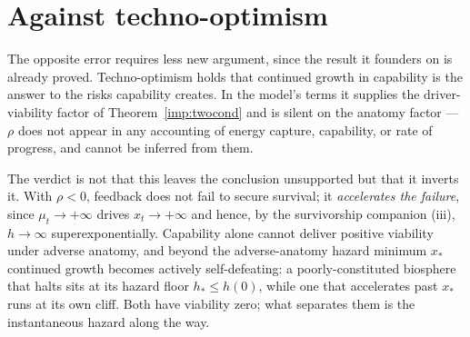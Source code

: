 \section{Against techno-optimism}\label{sec:optimism}


The opposite error requires less new argument, since the result it
founders on is already proved. Techno-optimism holds that continued growth in capability is the answer
to the risks capability creates. In the model's terms it supplies the
driver-viability factor of Theorem~\ref{imp:twocond} and is silent on
the anatomy factor --- $\rho$ does not appear in any accounting of energy
capture, capability, or rate of progress, and cannot be inferred from
them.

The verdict is not that this leaves the conclusion unsupported but that
it inverts it. With $\rho<0$, feedback does not fail to secure survival;
it \emph{accelerates the failure}, since $\mu_t\to+\infty$ drives
$x_t\to+\infty$ and hence, by
the survivorship companion \cite{GoldenSurvivorship}(iii), $h\to\infty$
superexponentially. Capability alone cannot deliver positive viability
under adverse anatomy, and beyond the adverse-anatomy hazard minimum
$x_\ast$ continued growth becomes actively self-defeating: a
poorly-constituted biosphere that halts sits at its hazard floor
$h_\ast\le h(0)$, while one that accelerates past $x_\ast$ runs at its
own cliff. Both have viability zero; what separates them is the
instantaneous hazard along the way.

